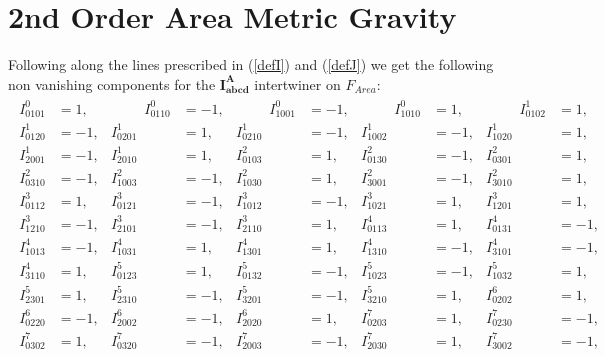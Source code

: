 \documentclass[a4paper,12pt, DIV=14, BCOR=5mm, twoside, headsepline, numbers=noenddot]{scrbook}
\begin{document}
\section{2nd Order Area Metric Gravity}\label{AppArea}
Following along the lines prescribed in (\ref{defI}) and (\ref{defJ}) we get the following non vanishing components for the $\boldsymbol{I^A_{abcd}}$ intertwiner on $F_{Area}$:
\begin{align}\label{AreaI}
    \begin{alignedat}{5}
   I^{0}_{0101} &= 1,   &  \hspace{1cm} 
I^{0}_{0110} &= -1,   &  \hspace{1cm} 
I^{0}_{1001} &= -1,     &  \hspace{1cm} 
I^{0}_{1010} &= 1,   &  \hspace{1cm} 
I^{1}_{0102} &= 1,   \\  
I^{1}_{0120} &= -1,       &
I^{1}_{0201} &= 1,   &  
I^{1}_{0210} &= -1,   &  
I^{1}_{1002} &= -1,       &
I^{1}_{1020} &= 1,   \\
I^{1}_{2001} &= -1,   &  
I^{1}_{2010} &= 1,       &
I^{2}_{0103} &= 1,   &  
I^{2}_{0130} &= -1,   &  
I^{2}_{0301} &= 1,       \\
I^{2}_{0310} &= -1,   &  
I^{2}_{1003} &= -1,   &  
I^{2}_{1030} &= 1,       &
I^{2}_{3001} &= -1,   &  
I^{2}_{3010} &= 1,  \\  
I^{3}_{0112} &= 1,       &
I^{3}_{0121} &= -1,   &  
I^{3}_{1012} &= -1,   &  
I^{3}_{1021} &= 1,       &
I^{3}_{1201} &= 1,   \\  
I^{3}_{1210} &= -1,   &  
I^{3}_{2101} &= -1,       &
I^{3}_{2110} &= 1,   &  
I^{4}_{0113} &= 1,   &  
I^{4}_{0131} &= -1,       \\
I^{4}_{1013} &= -1,   &  
I^{4}_{1031} &= 1,   &  
I^{4}_{1301} &= 1,       &
I^{4}_{1310} &= -1,   &  
I^{4}_{3101} &= -1,   \\  
I^{4}_{3110} &= 1,       &
I^{5}_{0123} &= 1,   &  
I^{5}_{0132} &= -1,   &  
I^{5}_{1023} &= -1,       &
I^{5}_{1032} &= 1,   \\  
I^{5}_{2301} &= 1,   &  
I^{5}_{2310} &= -1,       &
I^{5}_{3201} &= -1,   &  
I^{5}_{3210} &= 1,   &  
I^{6}_{0202} &= 1,       \\
I^{6}_{0220} &= -1,   &  
I^{6}_{2002} &= -1,   &  
I^{6}_{2020} &= 1,       &
I^{7}_{0203} &= 1,   &  
I^{7}_{0230} &= -1,   \\  
I^{7}_{0302} &= 1,       &
I^{7}_{0320} &= -1,   &  
I^{7}_{2003} &= -1,   &  
I^{7}_{2030} &= 1,       &
I^{7}_{3002} &= -1,   \\  

\end{alignedat}
\end{align}
\end{document}
